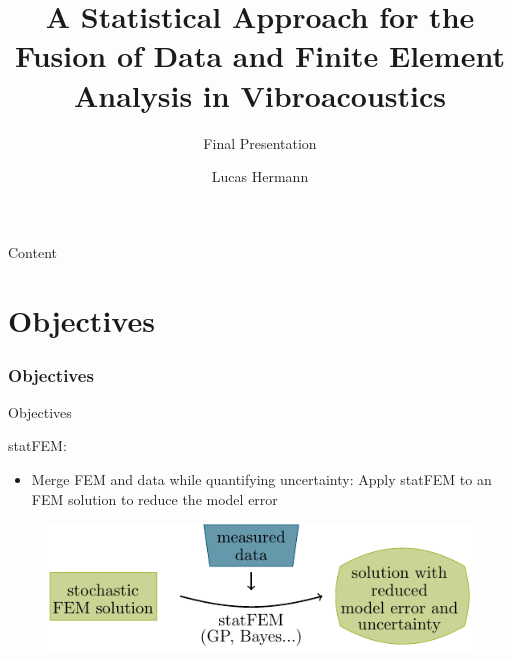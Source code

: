 \documentclass[fleqn,11pt,aspectratio=43]{beamer}
\title{A Statistical Approach for the Fusion of
Data and Finite Element Analysis in
Vibroacoustics}
\subtitle{Final Presentation}
\author{Lucas Hermann}
\begin{document}
\begin{frame}[plain]
\titlepage
\end{frame}
\begin{frame}{Content}
\tableofcontents[part=1]

\tableofcontents[part=2]

\tableofcontents[part=3]
\end{frame}
\part{Objectives}

\begin{frame}[plain]
  \partpage
\end{frame}


\section{Objectives}



\begin{frame}{Objectives}

statFEM:
\begin{itemize}
  \item Merge FEM and data while quantifying uncertainty:
   Apply statFEM to an FEM solution to reduce the model error
      
 
\end{itemize}

\begin{figure}[h]
\begin{center}
\includegraphics[scale=1]{intro}
\end{center}
\end{figure}

\end{frame}
\end{document}
